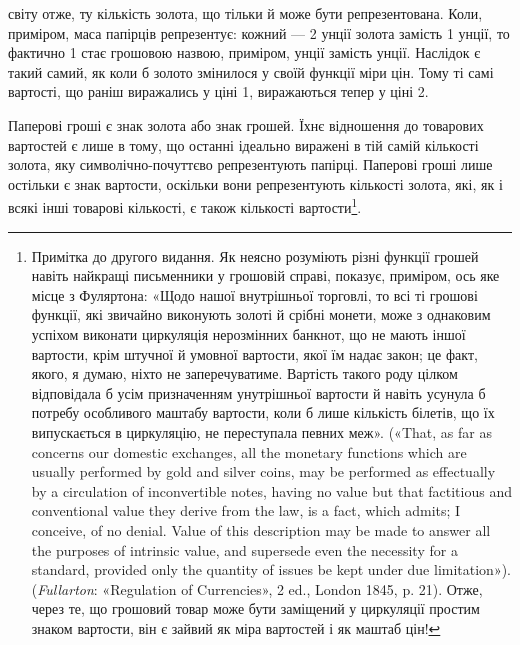 \parcont{}  %
світу отже, ту кількість золота, що тільки й може бути репрезентована.
Коли, приміром, маса папірців репрезентує: кожний —
2 унції золота замість 1 унції, то фактично 1
стає грошовою назвою, приміром,  унції замість  унції.
Наслідок є такий самий, як коли б золото змінилося у своїй
функції міри цін. Тому ті самі вартості, що раніш виражались
у ціні 1, виражаються тепер у ціні 2.

Паперові гроші є знак золота або знак грошей. Їхнє відношення
до товарових вартостей є лише в тому, що останні ідеально виражені
в тій самій кількості золота, яку символічно-почуттєво
репрезентують папірці. Паперові гроші лише остільки є знак
вартости, оскільки вони репрезентують кількості золота, які,
як і всякі інші товарові кількості, є також кількості вартости\footnote{
Примітка до другого видання. Як неясно розуміють різні функції
грошей навіть найкращі письменники у грошовій справі, показує, приміром,
ось яке місце з Фуляртона: «Щодо нашої внутрішньої торговлі, то
всі ті грошові функції, які звичайно виконують золоті й срібні монети,
може з однаковим успіхом виконати циркуляція нерозмінних банкнот,
що не мають іншої вартости, крім штучної й умовної вартости, якої їм
надає закон; це факт, якого, я думаю, ніхто не заперечуватиме. Вартість
такого роду цілком відповідала б усім призначенням унутрішньої вартости
й навіть усунула б потребу особливого маштабу вартости, коли б лише
кількість білетів, що їх випускається в циркуляцію, не переступала
певних меж». («That, as far as concerns our domestic exchanges, all the
monetary functions which are usually performed by gold and silver coins,
may be performed as effectually by a circulation of inconvertible notes,
having no value but that factitious and conventional value they derive
from the law, is a fact, which admits; I conceive, of no denial. Value of
this description may be made to answer all the purposes of intrinsic value,
and supersede even the necessity for a standard, provided only the quantity
of issues be kept under due limitation»). (\emph{Fullarton}: «Regulation of
Currencies», 2 ed., London 1845, p. 21). Отже, через те, що грошовий
товар може бути заміщений у циркуляції простим знаком вартости, він
є зайвий як міра вартостей і як маштаб цін!
}.

